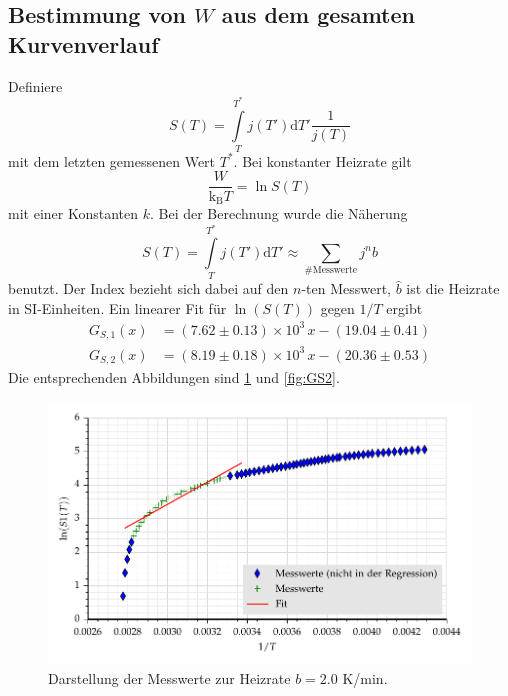 \subsection{Bestimmung von $W$ aus dem gesamten Kurvenverlauf}
Definiere
\begin{equation}
S(T)=\int\limits_T^{T^*} j(T') \text{d}T' \frac{1}{j(T)}
\end{equation}
mit dem letzten gemessenen Wert $T^*$.
Bei konstanter Heizrate gilt
\begin{equation}
\frac{W}{\text{k}_\text{B} T}=\ln S(T)
\end{equation}
mit einer Konstanten $k$. Bei der Berechnung wurde die Näherung
\begin{equation}
S(T)=\int\limits_T^{T^*} j(T') \text{d}T' \approx \sum\limits_{\#\text{Messwerte}} j^n  \hat{b}
\end{equation}
benutzt. Der Index bezieht sich dabei auf den $n$-ten Messwert, $\hat{b}$ ist die
Heizrate in SI-Einheiten. Ein linearer Fit für $\ln(S(T))$ gegen $1/T$ ergibt
%
%
\begin{align}
G_{S,1}(x)&= (7.62 \pm 0.13 )\times 10^{3} \,x - (19.04 \pm 0.41)  \\
G_{S,2}(x)&= (8.19 \pm 0.18 )\times 10^{3} \,x - (20.36 \pm 0.53)
\end{align}
Die entsprechenden Abbildungen sind \ref{fig:GS1} und \ref{fig:GS2}.
\begin{figure}[h]
\centering
\includegraphics[scale=0.8]{../skript/S1.pdf}
\caption{Darstellung der Messwerte zur Heizrate $b=2.0$ K/min.}
\label{fig:GS1}
\end{figure}
